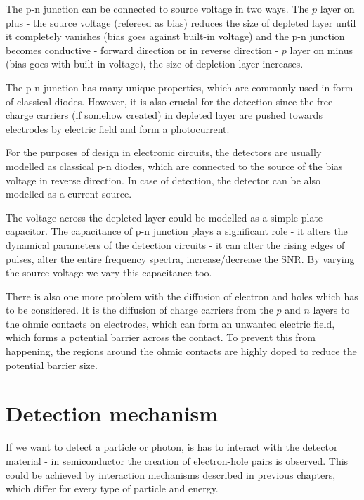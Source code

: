 \par
The p-n junction can be connected to source voltage in two ways. The $p$ layer on plus - the source voltage (refereed as bias) reduces the size of depleted layer until it completely vanishes (bias goes against built-in voltage) and the p-n junction becomes conductive - forward direction or in reverse direction - $p$ layer on minus (bias goes with built-in voltage), the size of depletion layer increases.


\par
The p-n junction has many unique properties, which are commonly used in form of classical diodes. However, it is also crucial for the detection since the free charge carriers (if somehow created) in depleted layer are pushed towards electrodes by electric field and form a photocurrent.

\par
For the purposes of design in electronic circuits, the detectors are usually modelled as classical p-n diodes, which are connected to the source of the bias voltage in reverse direction. In case of detection, the detector can be also modelled as a current source.


\par
The voltage across the depleted layer could be modelled as a simple plate capacitor. The capacitance of p-n junction plays a significant role - it alters the dynamical parameters of the detection circuits - it can alter the rising edges of pulses, alter the entire frequency spectra, increase/decrease the SNR. By varying the source voltage we vary this capacitance too.

\par
There is also one more problem with the diffusion of electron and holes which has to be considered. It is the diffusion of charge carriers from the $p$ and $n$ layers to the ohmic contacts on electrodes, which can form an unwanted electric field, which forms a potential barrier across the contact. To prevent this from happening, the regions around the ohmic contacts are highly doped to reduce the potential barrier size. 


\section{Detection mechanism}

\par
If we want to detect a particle or photon, is has to interact with the detector material - in semiconductor the creation of electron-hole pairs is observed. This could be achieved by interaction mechanisms described in previous chapters, which differ for every type of particle and energy. 

